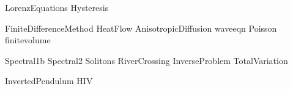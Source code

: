 \documentclass[nociteref]{SIAM-GH-book}
\begin{document}
{LorenzEquations}
{Hysteresis}

{FiniteDifferenceMethod}
{HeatFlow}
{AnisotropicDiffusion}
{waveeqn}
{Poisson}
{finitevolume}


{Spectral1b}
{Spectral2}
{Solitons}
{RiverCrossing}
{InverseProblem}
{TotalVariation}

{InvertedPendulum}
{HIV}
\end{document}
